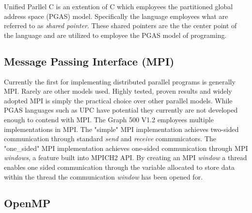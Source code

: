 \documentclass[11pt]{amsart}
\begin{document}
	Unified Parllel C is an extention of C which employees the partitioned global address space (PGAS) model.  Specifically the language employees what are referred to as \emph{shared pointer}.  These shared pointers are the the center point of the language and are utilized to employee the PGAS model of programing.  
\subsection{Message Passing Interface (MPI)}
	Currently the first for implementing distributed parallel programs is generally MPI.  Rarely are other models used.  Highly tested, proven results and widely adopted MPI is simply the practical choice over other parallel models.  While PGAS languages such as UPC have potential they currently are not developed enough to contend with MPI.  
	The Graph 500 V1.2 employees multiple implementations in MPI.  The "simple" MPI implementation achieves two-sided communication through standard \emph{send} and \emph{receive} communicators.  The "one_sided" MPI implementation achieves one-sided communication through MPI \emph{windows}, a feature built into MPICH2 API.  By creating an MPI \emph{window} a thread enables one sided communication through the variable allocated to store data within the thread the communication \emph{window} has been opened for.  
		
\subsection{OpenMP}	
\end{document}
